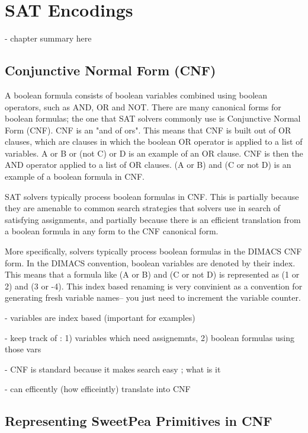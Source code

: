 
\chapter{SAT Encodings}

- chapter summary here

\section{Conjunctive Normal Form (CNF)}

A boolean formula consists of boolean variables combined using boolean operators, such as AND, OR and NOT. There are many canonical forms for boolean formulas; the one that SAT solvers commonly use is Conjunctive Normal Form (CNF). CNF is an "and of ors". This means that CNF is built out of OR clauses, which are clauses in which the boolean OR operator is applied to a list of variables. A or B or (not C) or D is an example of an OR clause. CNF is then the AND operator applied to a list of OR clauses. (A or B) and (C or not D) is an example of a boolean formula in CNF.

SAT solvers typically process boolean formulas in CNF. This is partially because they are amenable to common search strategies that solvers use in search of satisfying assignments, and partially because there is an efficient translation from a boolean formula in any form to the CNF canonical form.

More specifically, solvers typically process boolean formulas in the DIMACS CNF form. In the DIMACS convention, boolean variables are denoted by their index. This means that a formula like (A or B) and (C or not D) is represented as (1 or 2) and (3 or -4). This index based renaming is very convinient as a convention for generating fresh variable names-- you just need to increment the variable counter.

- variables are index based (important for examples)

- keep track of : 1) variables which need assignemnts, 2) boolean formulas using those vars

- CNF is standard because it makes search easy ; what is it

- can efficently (how efficeintly) translate into CNF

\section{Representing SweetPea Primitives in CNF}

